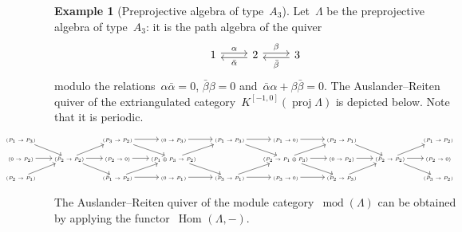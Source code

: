 \documentclass{amsart}
\theoremstyle{definition}
\newtheorem{example}[theorem]{Example}
\newcommand{\Hom}[1]{\operatorname{Hom}_{#1}}
\newcommand{\MOD}{\operatorname{mod}}
\newcommand{\proj}{\operatorname{proj}}
\begin{document}
\begin{example}[Preprojective algebra of type~$A_3$]\label{exm:preprojective silting objects}
Let~$\Lambda$ be the preprojective algebra of type~$A_3$: it is the path algebra of the quiver
\[
\begin{tikzcd}
	1\arrow[r, shift left = 2pt, "\alpha"] & 2\arrow[l, shift left = 2pt, "\bar \alpha"] \arrow[r, shift left = 2pt, "\beta"]& 3\arrow[l, shift left = 2pt, "\bar \beta"]
\end{tikzcd}
\] 
modulo the relations~$\alpha \bar \alpha = 0$, $\bar \beta \beta = 0$ and~$\bar \alpha \alpha + \beta \bar \beta = 0$. 
The Auslander--Reiten quiver of the extriangulated category~$K^{[-1,0]}(\proj \Lambda)$ is depicted below. Note that it is periodic.
 
\[
\hspace*{-2cm}
{\tiny
\begin{tikzcd}
    (P_1 \to P_3)\arrow[dr] && (P_3\to P_2)\arrow[r]\arrow[dr] & (0\to P_3)\arrow[r]& (P_1\to P_3)\arrow[r]\arrow[dr] & (P_1\to 0)\arrow[r] & (P_2\to P_1)\arrow[dr]&& (P_1\to P_2) \\
    (0\to P_2)\ar[r] & (P_2\to P_2)\arrow[ur]\arrow[dr]\arrow[r] & (P_2\to 0)\arrow[r] & (P_1\oplus P_3\to P_2)\arrow[ur]\arrow[dr] && (P_2\to P_1\oplus P_3)\arrow[ur]\arrow[dr]\arrow[r] & (0\to P_2)\arrow[r] & (P_2\to P_2)\arrow[ur]\arrow[dr]\arrow[r] & (P_2\to 0) \\
    (P_2\to P_1)\arrow[ur] && (P_1\to P_2)\arrow[ur]\arrow[r] & (0\to P_1)\arrow[r] & (P_3\to P_1)\arrow[r]\arrow[ur] & (P_3\to 0)\arrow[r] & (P_2\to P_3)\arrow[ur] && (P_3\to P_2)
\end{tikzcd}
}
\]

\medskip
The Auslander--Reiten quiver of the module category~$\MOD(\Lambda)$ can be obtained by applying the functor~$\Hom{}(\Lambda, -)$.
 

\end{example}
\end{document}
